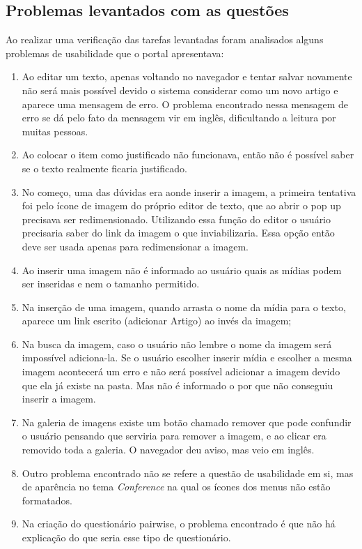 \subsection{Problemas levantados com as questões}

Ao realizar uma verificação das tarefas levantadas foram analisados alguns problemas de usabilidade que o portal apresentava: 

\begin{enumerate}

\item Ao editar um texto, apenas voltando no navegador e tentar salvar novamente não será mais possível devido o sistema considerar como um novo artigo e aparece uma mensagem de erro. O problema encontrado nessa mensagem de erro se dá pelo fato da mensagem vir em inglês, dificultando a leitura por muitas pessoas. 

\item Ao colocar o item como justificado não funcionava, então não é possível saber se o texto realmente ficaria justificado. 

\item No começo, uma das dúvidas era aonde inserir a imagem, a primeira tentativa foi pelo ícone de imagem do próprio editor de texto, que ao
abrir o pop up precisava ser redimensionado. Utilizando essa função do editor o usuário precisaria saber do link da imagem o que inviabilizaria. Essa opção então deve ser usada apenas para redimensionar a imagem.

\item Ao inserir uma imagem não é informado ao usuário quais as mídias podem ser inseridas e nem o tamanho permitido.

\item Na inserção de uma imagem, quando arrasta o nome da mídia para o texto, aparece um link escrito (adicionar Artigo) ao invés da imagem;

\item Na busca da imagem, caso o usuário não lembre o nome da imagem será impossível adiciona-la. Se o usuário escolher inserir mídia e escolher a mesma imagem acontecerá um erro e não será possível adicionar a imagem devido que ela já existe na pasta. Mas não é informado o por que não conseguiu inserir a imagem.

\item Na galeria de imagens existe um botão chamado remover que pode confundir o usuário pensando que serviria para remover a imagem, e ao clicar era removido toda a galeria. O navegador deu aviso, mas veio em inglês.

\item  Outro problema encontrado não se refere a questão de usabilidade em si, mas de aparência no tema \textit{Conference} na qual os ícones dos menus não estão formatados.

\item Na criação do questionário pairwise, o problema encontrado é que não há explicação do que seria esse tipo de questionário.

\end{enumerate}


